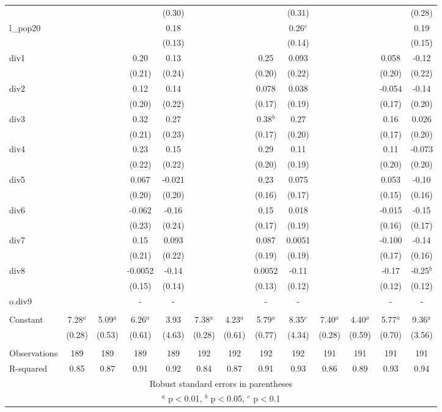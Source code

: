 \documentclass[]{article}
\begin{document}
\begin{tabular}{lcccccccccccc}
 &  &  &  & (0.30) &  &  &  & (0.31) &  &  &  & (0.28) \\
l\_pop20 &  &  &  & 0.18 &  &  &  & 0.26$^c$ &  &  &  & 0.19 \\
 &  &  &  & (0.13) &  &  &  & (0.14) &  &  &  & (0.15) \\
div1 &  &  & 0.20 & 0.13 &  &  & 0.25 & 0.093 &  &  & 0.058 & -0.12 \\
 &  &  & (0.21) & (0.24) &  &  & (0.20) & (0.22) &  &  & (0.20) & (0.22) \\
div2 &  &  & 0.12 & 0.14 &  &  & 0.078 & 0.038 &  &  & -0.054 & -0.14 \\
 &  &  & (0.20) & (0.22) &  &  & (0.17) & (0.19) &  &  & (0.17) & (0.20) \\
div3 &  &  & 0.32 & 0.27 &  &  & 0.38$^b$ & 0.27 &  &  & 0.16 & 0.026 \\
 &  &  & (0.21) & (0.23) &  &  & (0.17) & (0.20) &  &  & (0.17) & (0.20) \\
div4 &  &  & 0.23 & 0.15 &  &  & 0.29 & 0.11 &  &  & 0.11 & -0.073 \\
 &  &  & (0.22) & (0.22) &  &  & (0.20) & (0.19) &  &  & (0.20) & (0.20) \\
div5 &  &  & 0.067 & -0.021 &  &  & 0.23 & 0.075 &  &  & 0.053 & -0.10 \\
 &  &  & (0.20) & (0.20) &  &  & (0.16) & (0.17) &  &  & (0.15) & (0.16) \\
div6 &  &  & -0.062 & -0.16 &  &  & 0.15 & 0.018 &  &  & -0.015 & -0.15 \\
 &  &  & (0.23) & (0.24) &  &  & (0.17) & (0.19) &  &  & (0.16) & (0.17) \\
div7 &  &  & 0.15 & 0.093 &  &  & 0.087 & 0.0051 &  &  & -0.100 & -0.14 \\
 &  &  & (0.21) & (0.22) &  &  & (0.19) & (0.19) &  &  & (0.17) & (0.16) \\
div8 &  &  & -0.0052 & -0.14 &  &  & 0.0052 & -0.11 &  &  & -0.17 & -0.25$^b$ \\
 &  &  & (0.15) & (0.14) &  &  & (0.13) & (0.12) &  &  & (0.12) & (0.12) \\
o.div9 &  &  & - & - &  &  & - & - &  &  & - & - \\
 &  &  &  &  &  &  &  &  &  &  &  &  \\
Constant & 7.28$^a$ & 5.09$^a$ & 6.26$^a$ & 3.93 & 7.38$^a$ & 4.23$^a$ & 5.79$^a$ & 8.35$^c$ & 7.40$^a$ & 4.40$^a$ & 5.77$^a$ & 9.36$^a$ \\
 & (0.28) & (0.53) & (0.61) & (4.63) & (0.28) & (0.61) & (0.77) & (4.34) & (0.28) & (0.59) & (0.70) & (3.56) \\
 &  &  &  &  &  &  &  &  &  &  &  &  \\
Observations & 189 & 189 & 189 & 189 & 192 & 192 & 192 & 192 & 191 & 191 & 191 & 191 \\
 R-squared & 0.85 & 0.87 & 0.91 & 0.92 & 0.84 & 0.87 & 0.91 & 0.93 & 0.86 & 0.89 & 0.93 & 0.94 \\ \hline
\multicolumn{13}{c}{ Robust standard errors in parentheses} \\
\multicolumn{13}{c}{ $^a$ p$<$0.01, $^b$ p$<$0.05, $^c$ p$<$0.1} \\
\end{tabular}
\end{document}
